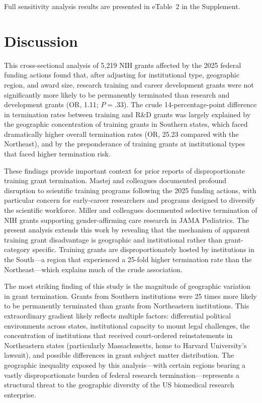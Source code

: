 \documentclass[10pt, letterpaper]{article}
\begin{document}
Full sensitivity analysis results are presented in eTable~2 in the Supplement.

\section*{Discussion}

This cross-sectional analysis of 5,219 NIH grants affected by the 2025 federal funding actions found that, after adjusting for institutional type, geographic region, and award size, research training and career development grants were not significantly more likely to be permanently terminated than research and development grants (OR, 1.11; $P = .33$). The crude 14-percentage-point difference in termination rates between training and R\&D grants was largely explained by the geographic concentration of training grants in Southern states, which faced dramatically higher overall termination rates (OR, 25.23 compared with the Northeast), and by the preponderance of training grants at institutional types that faced higher termination risk.

These findings provide important context for prior reports of disproportionate training grant termination. Mastej and colleagues documented profound disruption to scientific training programs following the 2025 funding actions, with particular concern for early-career researchers and programs designed to diversify the scientific workforce.\cite{Mastej2025} Miller and colleagues documented selective termination of NIH grants supporting gender-affirming care research in JAMA Pediatrics.\cite{Miller2026} The present analysis extends this work by revealing that the mechanism of apparent training grant disadvantage is geographic and institutional rather than grant-category specific. Training grants are disproportionately hosted by institutions in the South---a region that experienced a 25-fold higher termination rate than the Northeast---which explains much of the crude association.

The most striking finding of this study is the magnitude of geographic variation in grant termination. Grants from Southern institutions were 25 times more likely to be permanently terminated than grants from Northeastern institutions. This extraordinary gradient likely reflects multiple factors: differential political environments across states, institutional capacity to mount legal challenges, the concentration of institutions that received court-ordered reinstatements in Northeastern states (particularly Massachusetts, home to Harvard University's lawsuit), and possible differences in grant subject matter distribution.\cite{Gonsalves2025} The geographic inequality exposed by this analysis---with certain regions bearing a vastly disproportionate burden of federal research termination---represents a structural threat to the geographic diversity of the US biomedical research enterprise.
\end{document}
